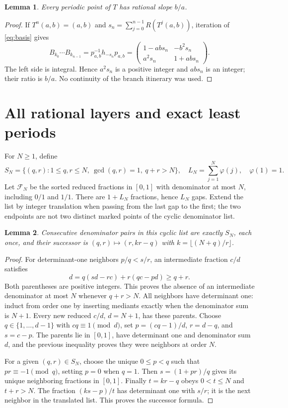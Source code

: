 \documentclass[10pt]{article}
\newtheorem{lemma}{Lemma}
\begin{document}
\begin{lemma}\label{lem:irrational}
Every periodic point of $T$ has rational slope $b/a$.
\end{lemma}
\begin{proof}
If $T^n(a,b)=(a,b)$ and $s_n=\sum_{j=0}^{n-1}R(T^j(a,b))$, iteration of
\eqref{eq:basis} gives
\begin{equation}\label{eq:integer}
B_{k_0}\cdots B_{k_{n-1}}
=p_{a,b}^{-1}h_{-s_n}p_{a,b}
=\begin{pmatrix}1-abs_n&-b^2s_n\\a^2s_n&1+abs_n\end{pmatrix}.
\end{equation}
The left side is integral. Hence $a^2s_n$ is a positive integer and
$abs_n$ is an integer; their ratio is $b/a$.
No continuity of the branch itinerary was used.
\end{proof}

\section{All rational layers and exact least periods}
For $N\geq1$, define
\[
S_N=\{(q,r):1\leq q,r\leq N,\ \gcd(q,r)=1,\ q+r>N\},
\quad L_N=\sum_{j=1}^N\varphi(j),\quad\varphi(1)=1.
\]
Let $\mathcal F_N$ be the sorted reduced fractions in $[0,1]$ with
denominator at most $N$, including $0/1$ and $1/1$. There are $1+L_N$
fractions, hence $L_N$ gaps. Extend the list by integer translation when
passing from the last gap to the first; the two endpoints are not two
distinct marked points of the cyclic denominator list.

\begin{lemma}\label{lem:farey}
Consecutive denominator pairs in this cyclic list are exactly $S_N$, each
once, and their successor is
$(q,r)\mapsto(r,kr-q)$ with $k=\lfloor(N+q)/r\rfloor$.
\end{lemma}
\begin{proof}
For determinant-one neighbors $p/q<s/r$, an intermediate fraction $c/d$
satisfies
\[
d=q(sd-rc)+r(qc-pd)\geq q+r.
\]
Both parentheses are positive integers. This proves the absence of an
intermediate denominator at most $N$ whenever $q+r>N$.
All neighbors have determinant one: induct from order one by inserting
mediants exactly when the denominator sum is $N+1$. Every new reduced
$c/d$, $d=N+1$, has these parents. Choose $q\in\{1,\ldots,d-1\}$ with
$cq\equiv1\pmod d$, set $p=(cq-1)/d$, $r=d-q$, and $s=c-p$.
The parents lie in $[0,1]$, have determinant one and denominator sum $d$,
and the previous inequality proves they were neighbors at order $N$.

For a given $(q,r)\in S_N$, choose the unique $0\leq p<q$ such that
$pr\equiv-1\pmod q$, setting $p=0$ when $q=1$.
Then $s=(1+pr)/q$ gives its unique neighboring fractions in $[0,1]$.
Finally $t=kr-q$ obeys $0<t\leq N$ and $t+r>N$.
The fraction $(ks-p)/t$ has determinant one with $s/r$; it is the next
neighbor in the translated list. This proves the successor formula.
\end{proof}
\end{document}
